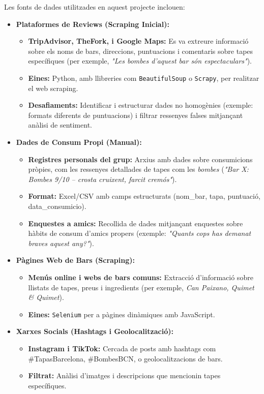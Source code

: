 \documentclass[12pt,a4paper]{article}
\begin{document}
\noindent Les fonts de dades utilitzades en aquest projecte inclouen:

\begin{itemize}
    \item \textbf{Plataformes de Reviews (Scraping Inicial):}
    \begin{itemize}
        \item \textbf{TripAdvisor, TheFork, i Google Maps:} Es va extreure informació sobre els noms de bars, direccions, puntuacions i comentaris sobre tapes específiques (per exemple, \textit{"Les bombes d’aquest bar són espectaculars"}).
        \item \textbf{Eines:} Python, amb llibreries com \texttt{BeautifulSoup} o \texttt{Scrapy}, per realitzar el web scraping.
        \item \textbf{Desafiaments:} Identificar i estructurar dades no homogènies (exemple: formats diferents de puntuacions) i filtrar ressenyes falses mitjançant anàlisi de sentiment.
    \end{itemize}

    \item \textbf{Dades de Consum Propi (Manual):}
    \begin{itemize}
        \item \textbf{Registres personals del grup:} Arxius amb dades sobre consumicions pròpies, com les ressenyes detallades de tapes com les \textit{bombes} (\textit{"Bar X: Bombes 9/10 – crosta cruixent, farcit cremós"}).
        \item \textbf{Format:} Excel/CSV amb camps estructurats (nom\_bar, tapa, puntuació, data\_consumicio).
        \item \textbf{Enquestes a amics:} Recollida de dades mitjançant enquestes sobre hàbits de consum d’amics propers (exemple: \textit{"Quants cops has demanat braves aquest any?"}).
    \end{itemize}

    \item \textbf{Pàgines Web de Bars (Scraping):}
    \begin{itemize}
        \item \textbf{Menús online i webs de bars comuns:} Extracció d’informació sobre llistats de tapes, preus i ingredients (per exemple, \textit{Can Paixano, Quimet \& Quimet}).
        \item \textbf{Eines:} \texttt{Selenium} per a pàgines dinàmiques amb JavaScript.
    \end{itemize}

    \item \textbf{Xarxes Socials (Hashtags i Geolocalització):}
    \begin{itemize}
        \item \textbf{Instagram i TikTok:} Cercada de posts amb hashtags com \#TapasBarcelona, \#BombesBCN, o geolocalitzacions de bars.
        \item \textbf{Filtrat:} Anàlisi d’imatges i descripcions que mencionin tapes específiques.
    \end{itemize}
\end{itemize}
\end{document}
